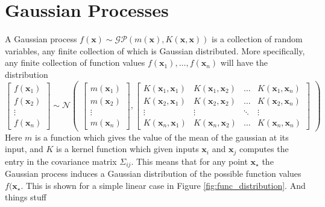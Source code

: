 \documentclass{article}
\begin{document}
\section*{Gaussian Processes}

A Gaussian process $f(\mathbf{x}) \sim \mathcal{GP}(m(\mathbf{x}), K(\mathbf{x}, \mathbf{x}))$ is a collection
of random variables, any finite collection of which is Gaussian distributed. More specifically, any finite collection 
of function values $f(\mathbf{x}_1), \dots, f(\mathbf{x}_n)$ will have the distribution
\[
    \begin{bmatrix}
        f(\mathbf{x}_1) \\
        f(\mathbf{x}_2) \\
        \vdots \\
        f(\mathbf{x}_n)
    \end{bmatrix} \sim 
    \mathcal{N}\begin{pmatrix}
        \begin{bmatrix}
            m(\mathbf{x}_1) \\
            m(\mathbf{x}_2) \\
            \vdots \\
            m(\mathbf{x}_n)
        \end{bmatrix}, 
        \begin{bmatrix}
            K(\mathbf{x}_1, \mathbf{x}_1) & K(\mathbf{x}_1, \mathbf{x}_2) & \dots & K(\mathbf{x}_1, \mathbf{x}_n) \\
            K(\mathbf{x}_2, \mathbf{x}_1) & K(\mathbf{x}_2, \mathbf{x}_2) & \dots & K(\mathbf{x}_2, \mathbf{x}_n) \\
            \vdots & \vdots & \ddots & \vdots \\
            K(\mathbf{x}_n, \mathbf{x}_1) & K(\mathbf{x}_n, \mathbf{x}_2) & \dots & K(\mathbf{x}_n, \mathbf{x}_n)
        \end{bmatrix}
    \end{pmatrix}
\]
Here $m$ is a function which gives the value of the mean of the gaussian at its input, and $K$ is a kernel function which given
inputs $\mathbf{x}_i$ and $\mathbf{x}_j$ computes the entry in the covariance matrix $\Sigma_{ij}$. This means that for any point
$\mathbf{x}_{\star}$ the Gaussian process induces a Gaussian distribution of the possible function values $f(\mathbf{x}_{\star}$.
This is shown for a simple linear case in Figure \ref{fig:func_distribution}. And things stuff
\end{document}
